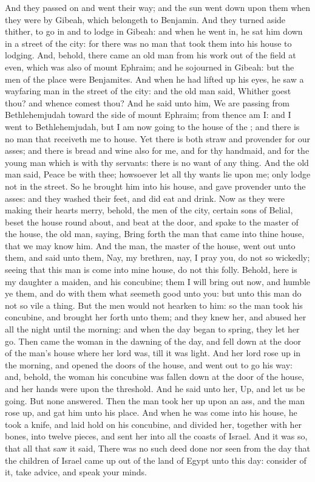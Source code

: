 \begin{biblechapter}
\verse And they passed on and went their way; and the sun went down upon them when they were by Gibeah, which belongeth to Benjamin.
\verse And they turned aside thither, to go in and to lodge in Gibeah: and when he went in, he sat him down in a street of the city: for there was no man that took them into his house to lodging.
\verse And, behold, there came an old man from his work out of the field at even, which was also of mount Ephraim; and he sojourned in Gibeah: but the men of the place were Benjamites.
\verse And when he had lifted up his eyes, he saw a wayfaring man in the street of the city: and the old man said, Whither goest thou? and whence comest thou?
\verse And he said unto him, We are passing from Bethlehemjudah toward the side of mount Ephraim; from thence am I: and I went to Bethlehemjudah, but I am now going to the house of the \LORD; and there is no man that receiveth me to house.
\verse Yet there is both straw and provender for our asses; and there is bread and wine also for me, and for thy handmaid, and for the young man which is with thy servants: there is no want of any thing.
\verse And the old man said, Peace be with thee; howsoever let all thy wants lie upon me; only lodge not in the street.
\verse So he brought him into his house, and gave provender unto the asses: and they washed their feet, and did eat and drink.
\verse Now as they were making their hearts merry, behold, the men of the city, certain sons of Belial, beset the house round about, and beat at the door, and spake to the master of the house, the old man, saying, Bring forth the man that came into thine house, that we may know him.
\verse And the man, the master of the house, went out unto them, and said unto them, Nay, my brethren, nay, I pray you, do not so wickedly; seeing that this man is come into mine house, do not this folly.
\verse Behold, here is my daughter a maiden, and his concubine; them I will bring out now, and humble ye them, and do with them what seemeth good unto you: but unto this man do not so vile a thing.
\verse But the men would not hearken to him: so the man took his concubine, and brought her forth unto them; and they knew her, and abused her all the night until the morning: and when the day began to spring, they let her go.
\verse Then came the woman in the dawning of the day, and fell down at the door of the man's house where her lord was, till it was light.
\verse And her lord rose up in the morning, and opened the doors of the house, and went out to go his way: and, behold, the woman his concubine was fallen down at the door of the house, and her hands were upon the threshold.
\verse And he said unto her, Up, and let us be going. But none answered. Then the man took her up upon an ass, and the man rose up, and gat him unto his place.
\verse And when he was come into his house, he took a knife, and laid hold on his concubine, and divided her, together with her bones, into twelve pieces, and sent her into all the coasts of Israel.
\verse And it was so, that all that saw it said, There was no such deed done nor seen from the day that the children of Israel came up out of the land of Egypt unto this day: consider of it, take advice, and speak your minds.
\end{biblechapter}

